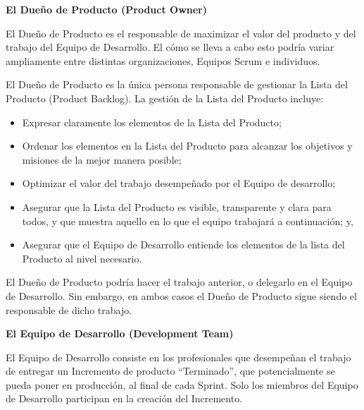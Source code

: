 \documentclass[12pt]{report}%
\begin{document}
\textbf {El Dueño de Producto (Product Owner) }

El Dueño de Producto es el responsable de maximizar el valor del producto y del trabajo del Equipo de Desarrollo. El cómo se lleva a cabo esto podría variar ampliamente entre distintas organizaciones, Equipos Scrum e individuos.

El Dueño de Producto es la única persona responsable de gestionar la Lista del Producto (Product Backlog). La gestión de la Lista del Producto incluye:
\begin{itemize} 
\item Expresar claramente los elementos de la Lista del Producto; 
\item Ordenar los elementos en la Lista del Producto para alcanzar los     objetivos y misiones de la mejor manera posible; 
\item Optimizar el valor del trabajo desempeñado por el Equipo de desarrollo; 
\item Asegurar que la Lista del Producto es visible, transparente y clara para todos, y que muestra aquello en lo que el equipo trabajará a continuación; y, 
\item Asegurar que el Equipo de Desarrollo entiende los elementos de la lista del Producto al nivel necesario. 
\end{itemize}

El Dueño de Producto podría hacer el trabajo anterior, o delegarlo en el Equipo de Desarrollo. Sin embargo, en ambos casos el Dueño de Producto sigue siendo el responsable de dicho trabajo.

\textbf{El Equipo de Desarrollo (Development Team) }

El Equipo de Desarrollo consiste en los profesionales que desempeñan el trabajo de entregar un Incremento de producto “Terminado”, que potencialmente se pueda poner en producción, al final de cada Sprint. Solo los miembros del Equipo de Desarrollo participan en la creación del Incremento.
\end{document}
